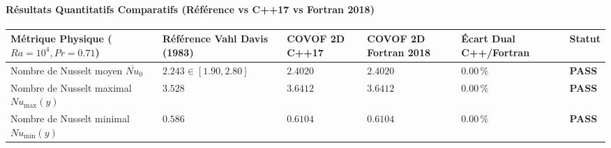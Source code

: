 \documentclass[
  10pt,
]{article}
\newcounter{none} %
\begin{document}
\paragraph{Résultats Quantitatifs Comparatifs (Référence vs C++17 vs
Fortran
2018)}\label{ruxe9sultats-quantitatifs-comparatifs-ruxe9fuxe9rence-vs-c17-vs-fortran-2018-9}

{\def\LTcaptype{none} %
\begin{longtable}[]{@{}
  >{\raggedright\arraybackslash}p{}
  >{\centering\arraybackslash}p{}
  >{\centering\arraybackslash}p{}
  >{\centering\arraybackslash}p{}
  >{\centering\arraybackslash}p{}
  >{\centering\arraybackslash}p{}@{}}
\toprule\noalign{}
\begin{minipage}[b]{\linewidth}\raggedright
Métrique Physique (\(Ra = 10^4, Pr = 0.71\))
\end{minipage} & \begin{minipage}[b]{\linewidth}\centering
Référence Vahl Davis (1983)
\end{minipage} & \begin{minipage}[b]{\linewidth}\centering
COVOF 2D C++17
\end{minipage} & \begin{minipage}[b]{\linewidth}\centering
COVOF 2D Fortran 2018
\end{minipage} & \begin{minipage}[b]{\linewidth}\centering
Écart Dual C++/Fortran
\end{minipage} & \begin{minipage}[b]{\linewidth}\centering
Statut
\end{minipage} \\
\midrule\noalign{}
\endhead
\bottomrule\noalign{}
\endlastfoot
Nombre de Nusselt moyen \(\overline{Nu}_0\) & \(2.243 \in [1.90, 2.80]\)
& \textbf{\(2.4020\)} & \textbf{\(2.4020\)} & \textbf{\(0.00\,\%\)} &
\textbf{PASS} \\
Nombre de Nusselt maximal \(Nu_{\max}(y)\) & \(3.528\) &
\textbf{\(3.6412\)} & \textbf{\(3.6412\)} & \textbf{\(0.00\,\%\)} &
\textbf{PASS} \\
Nombre de Nusselt minimal \(Nu_{\min}(y)\) & \(0.586\) &
\textbf{\(0.6104\)} & \textbf{\(0.6104\)} & \textbf{\(0.00\,\%\)} &
\textbf{PASS} \\
\end{longtable}
}
\end{document}
